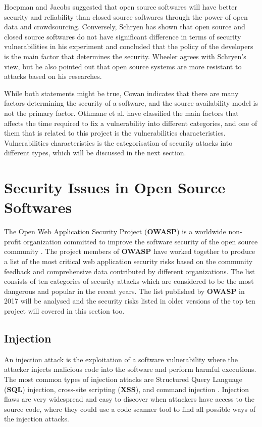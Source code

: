 \documentclass[12pt, a4paper]{report}
\begin{document}
Hoepman and Jacobs \cite{hoepman_2007} suggested that open source softwares will have better
security and reliability than closed source softwares through the power of open data and
crowdsourcing. Conversely, Schryen \cite{schryen_2011} has shown that open source and closed source
softwares do not have significant difference in terms of security vulnerabilities in his experiment
and concluded that the policy of the developers is the main factor that determines the security.
Wheeler \cite{wheeler_2015} agrees with Schryen's view, but he also pointed out that open source
systems are more resistant to attacks based on his researches.

While both statements might be true, Cowan \cite{cowan_2003} indicates that there are many factors
determining the security of a software, and the source availability model is not the primary factor.
Othmane et al. \cite{othmane_2015} have classified the main factors that affects the time required
to fix a vulnerability into different categories, and one of them that is related to this project is
the vulnerabilities characteristics. Vulnerabilities characteristics is the categorisation of
security attacks into different types, which will be discussed in the next section.

\section{Security Issues in Open Source Softwares}
The Open Web Application Security Project (\textbf{OWASP}) is a worldwide non-profit organization
committed to improve the software security of the open source community \cite{owasp_home}. The
project members of \textbf{OWASP} have worked together to produce a list of the most critical web
application security risks based on the community feedback and comprehensive data contributed by
different organizations. The list consists of ten categories of security attacks which are
considered to be the most dangerous and popular in the recent years. The list published by
\textbf{OWASP} in 2017 \cite{owasp_top10} will be analysed and the security risks listed in older
versions of the top ten project will covered in this section too.

\subsection{Injection}
An injection attack is the exploitation of a software vulnerability where the attacker injects
malicious code into the software and perform harmful executions. The most common types of injection
attacks are Structured Query Language (\textbf{SQL}) injection, cross-site scripting (\textbf{XSS}),
and command injection \cite{pietraszek_2006}. Injection flaws are very widespread and easy to
discover when attackers have access to the source code, where they could use a code scanner tool to
find all possible ways of the injection attacks.
\end{document}

